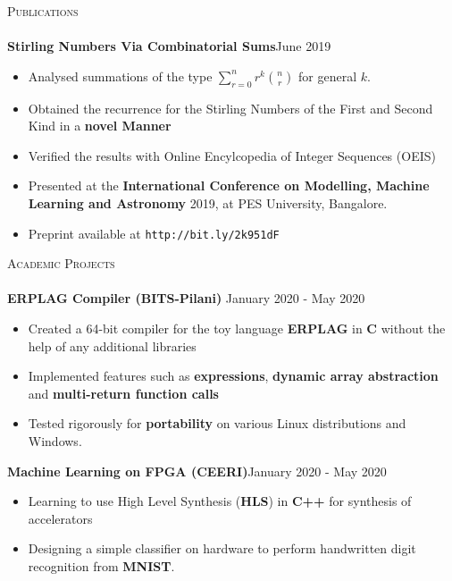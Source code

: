 \documentclass[a4paper]{article}
\newcommand{\lineunder} {
    \vspace*{-8pt} \\
    \hspace*{-18pt} \hrulefill \\
}
\newcommand{\header} [1] {
    {\hspace*{-18pt}\vspace*{6pt} \textsc{#1}}
    \vspace*{-6pt} \lineunder
}
\newcommand{\combinesum}[3]{ \displaystyle{\sum_{r=0}^{#1} {r^{#3}} {#1 \choose #2}}}
\begin{document}
\header{Publications}
{\textbf{Stirling Numbers Via Combinatorial Sums}}\hfill June 2019\\
\vspace{-1mm}
\begin{itemize} \itemsep 1pt
    \item Analysed summations of the type $\combinesum{n}{r}{k}$ for general $k$. 
    \item Obtained the recurrence for the Stirling Numbers of the First and Second Kind in a \textbf{novel Manner}
    \item Verified the results with Online Encylcopedia of Integer Sequences (OEIS)
    \item Presented at the \textbf{International Conference on Modelling, Machine Learning and Astronomy} 2019, at PES University, Bangalore.
    \item Preprint available at \texttt{http://bit.ly/2k951dF}
\end{itemize}
\vspace*{2mm}

\header{Academic Projects}
{\textbf{ERPLAG Compiler (BITS-Pilani)}} \hfill January 2020 - May 2020\\
\begin{itemize} \itemsep 1pt
    \item Created a 64-bit compiler for the toy language \textbf{ERPLAG} in \textbf{C} without the help of any additional libraries
    \item Implemented features such as \textbf{expressions}, \textbf{dynamic array abstraction} and \textbf{multi-return function calls}
    \item Tested rigorously for \textbf{portability} on various Linux distributions and Windows.
\end{itemize}
\vspace*{2mm}

{\textbf{Machine Learning on FPGA (CEERI)}}\hfill January 2020 - May 2020\\
\begin{itemize} \itemsep 1pt
    \item Learning to use High Level Synthesis (\textbf{HLS}) in \textbf{C++} for synthesis of accelerators
    \item Designing a simple classifier on hardware to perform handwritten digit recognition from \textbf{MNIST}.
\end{itemize}
\vspace*{2mm}
\end{document}
